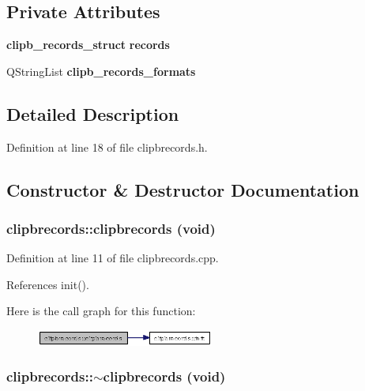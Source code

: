 \subsection*{Private Attributes}
\begin{CompactItemize}
\item 
{\bf clipb\_\-records\_\-struct} {\bf records}
\item 
QString\-List {\bf clipb\_\-records\_\-formats}
\end{CompactItemize}


\subsection{Detailed Description}




Definition at line 18 of file clipbrecords.h.

\subsection{Constructor \& Destructor Documentation}
\subsubsection{\setlength{\rightskip}{0pt plus 5cm}clipbrecords::clipbrecords (void)}\label{classclipbrecords_db47a32820dfe287ab51dac87d4cac8c}




Definition at line 11 of file clipbrecords.cpp.

References init().

Here is the call graph for this function:\begin{figure}[H]
\begin{center}
\leavevmode
\includegraphics[width=165pt]{classclipbrecords_db47a32820dfe287ab51dac87d4cac8c_cgraph}
\end{center}
\end{figure}
\subsubsection{\setlength{\rightskip}{0pt plus 5cm}clipbrecords::$\sim$clipbrecords (void)}\label{classclipbrecords_8c498ef073b5796bd4a077d12c7c49e3}




